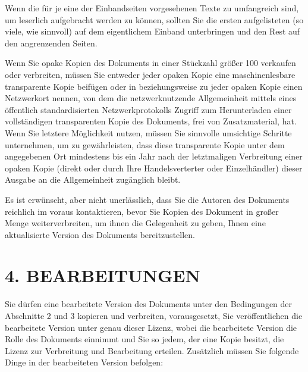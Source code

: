 Wenn die für je eine der Einbandseiten vorgesehenen Texte zu umfangreich sind, um
leserlich aufgebracht werden zu können, sollten Sie die ersten aufgelisteten 
(so viele, wie sinnvoll) auf dem eigentlichem Einband unterbringen und
den Rest auf den angrenzenden Seiten.

Wenn Sie opake Kopien des Dokuments in einer Stückzahl größer 100 verkaufen oder verbreiten,
müssen Sie entweder jeder opaken Kopie eine maschinenlesbare transparente Kopie beifügen
oder in beziehungsweise zu jeder opaken Kopie einen Netzwerkort nennen, von dem die 
netzwerknutzende Allgemeinheit mittels eines öffentlich standardisierten Netzwerkprotokolls 
Zugriff zum Herunterladen einer vollständigen transparenten Kopie des Dokuments,
frei von Zusatzmaterial, hat.
Wenn Sie letztere Möglichkeit nutzen, müssen Sie sinnvolle umsichtige Schritte
unternehmen, um zu gewährleisten, dass diese transparente Kopie unter dem
angegebenen Ort mindestens bis ein Jahr nach der letztmaligen Verbreitung 
einer opaken Kopie (direkt oder durch Ihre Handelsverterter oder Einzelhändler)
dieser Ausgabe an die Allgemeinheit zugänglich bleibt.

Es ist erwünscht, aber nicht unerlässlich, dass Sie die Autoren des Dokuments reichlich
im voraus kontaktieren, bevor Sie Kopien des Dokument in großer Menge weiterverbreiten,
um ihnen die Gelegenheit zu geben, Ihnen eine aktualisierte Version des Dokuments bereitzustellen.

\section*{4. BEARBEITUNGEN}

Sie dürfen eine bearbeitete Version des Dokuments unter den Bedingungen der 
Abschnitte 2 und 3 kopieren und verbreiten, vorausgesetzt, Sie veröffentlichen
die bearbeitete Version unter genau dieser Lizenz, wobei die bearbeitete Version
die Rolle des Dokuments einnimmt und Sie so jedem, der eine Kopie besitzt, die 
Lizenz zur Verbreitung und Bearbeitung erteilen.
Zusätzlich müssen Sie folgende Dinge in der bearbeiteten Version befolgen:

